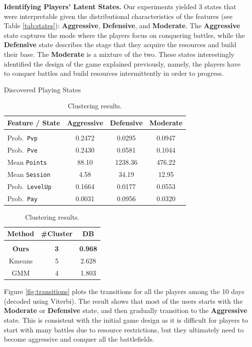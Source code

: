 {\bf Identifying Players' Latent States.} Our experiments yielded 3 states that were interpretable given the distributional characteristics of the features (see 
Table \ref{tab:states}): \textbf{Aggressive}, 
\textbf{Defensive}, and \textbf{Moderate}.  The \textbf{Aggressive} state captures 
the mode where the players focus on conquering battles, while the \textbf{Defensive} 
state describes the stage that they acquire the resources and build their base. The \textbf{Moderate} is a mixture
of the two. These states interestingly identified the design of the game explained previously,
namely, the players have to conquer battles and build resources intermittently in order to progress. 

\begin{table}
\parbox{.65\linewidth}{
\centering
\caption{Discovered Playing States}
\label{tab:states}
\centering
\scalebox{0.8}
{
\begin{tabular}{lccc} 
\bf Feature / State & \textbf{Aggressive}  & \textbf{Defensive}  &  \textbf{Moderate} 
\\ \hline \\
 Prob.\ \texttt{Pvp}     &  0.2472  & 0.0295 &  0.0947  \\
 Prob.\ \texttt{Pve}     &  0.2430  & 0.0581 &  0.1044 \\
 Mean \texttt{Points} &  88.10   & 1238.36 &  476.22 \\
 Mean \texttt{Session}&  4.58    &  34.19  & 12.95 \\
 Prob.\ \texttt{LevelUp} &  0.1664  & 0.0177  & 0.0553 \\
 Prob.\ \texttt{Pay}     &  0.0031  & 0.0956  & 0.0320 \\
\end{tabular}
}
}
\hfill
\parbox{.35\linewidth}{
\centering
\caption{Clustering results.}
\label{tab:clustering}
\begin{tabular}{ccc}
\bf Method & \bf \#Cluster & \bf DB
\\ \hline \\
{\bf Ours}     & {\bf 3}  &  {\bf 0.968} \\  
Kmeans  &  5  &  2.628 \\
GMM     &  4  &  1.803 
\end{tabular}
}
\end{table}

Figure \ref{fig:transitions} plots the transitions for all the players among the 10 days (decoded using Viterbi). 
The result shows that most of the users starts with the \textbf{Moderate} or \textbf{Defensive} state, 
and then gradually transition to the \textbf{Aggressive} state. 
This is  consistent with the initial game design as  it is difficult for players  to start with many battles due to  resource restrictions, but they ultimately need to become aggressive and conquer all the battlefields.

